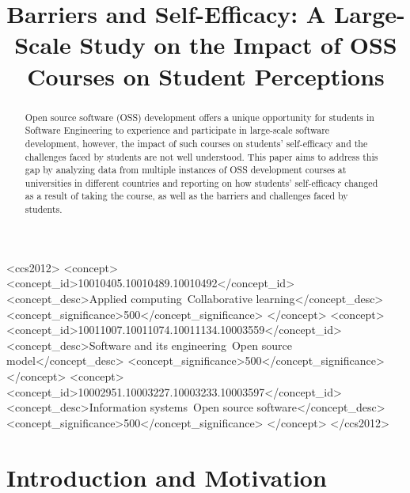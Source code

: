 \documentclass[sigconf]{acmart}
\begin{document}
\begin{sloppy}

\title[Barriers and Self-Efficacy]{Barriers and Self-Efficacy: A Large-Scale Study on the Impact of OSS Courses on Student Perceptions}

\begin{abstract}

Open source software (OSS) development offers a unique opportunity for students in Software Engineering to experience and participate in large-scale software development, however, the impact of such courses on students' self-efficacy and the challenges faced by students are not well understood. This paper aims to address this gap by analyzing data from multiple instances of OSS development courses at universities in different countries and reporting on how students' self-efficacy changed as a result of taking the course, as well as the barriers and challenges faced by students.

\end{abstract}

\begin{CCSXML}
<ccs2012>
<concept>
<concept_id>10010405.10010489.10010492</concept_id>
<concept_desc>Applied computing~Collaborative learning</concept_desc>
<concept_significance>500</concept_significance>
</concept>
<concept>
<concept_id>10011007.10011074.10011134.10003559</concept_id>
<concept_desc>Software and its engineering~Open source model</concept_desc>
<concept_significance>500</concept_significance>
</concept>
<concept>
<concept_id>10002951.10003227.10003233.10003597</concept_id>
<concept_desc>Information systems~Open source software</concept_desc>
<concept_significance>500</concept_significance>
</concept>
</ccs2012>
\end{CCSXML}



\maketitle

\section{Introduction and Motivation}


\end{sloppy}
\end{document}
